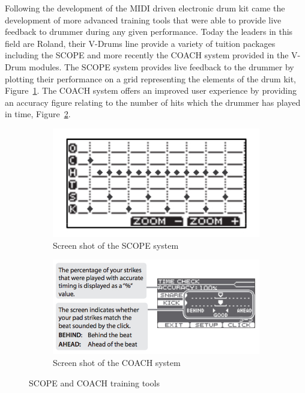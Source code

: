 \documentclass[a4paper, 11pt]{article}
\begin{document}
Following the development of the MIDI driven electronic drum kit came the development of more advanced training tools that were able to provide live feedback to drummer during any given performance. Today the leaders in this field are Roland, their V-Drums line provide a variety of tuition packages including the SCOPE and more recently the COACH system provided in the V-Drum modules. The SCOPE system provides live feedback to the drummer by plotting their performance on a grid representing the elements of the drum kit, Figure~\ref{fig: scope}. The COACH system offers an improved user experience by providing an accuracy figure relating to the number of hits which the drummer has played in time, Figure~\ref{fig: coach}.
\begin{figure}[ht]
\centering
\begin{subfigure}{.5\textwidth}
  \centering
  \includegraphics[width=0.5\linewidth]{images/Scope.jpg}
  \caption{Screen shot of the SCOPE system}
  \label{fig: scope}
\end{subfigure}%
\begin{subfigure}{.5\textwidth}
  \centering
  \includegraphics[width=0.75\linewidth]{images/coach.jpg}
  \caption{Screen shot of the COACH system}
  \label{fig: coach}
\end{subfigure}
\caption{SCOPE and COACH training tools}
\label{fig: systems}
\end{figure}
\end{document}

